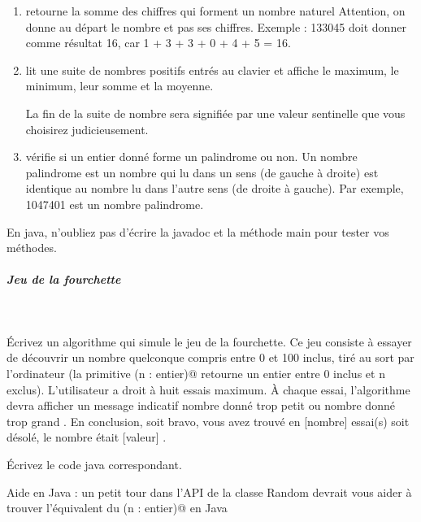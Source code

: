 \documentclass[11pt,a4paper]{article}
\begin{document}
\begin{enumerate}
			\item 
              retourne la somme des chiffres qui forment un nombre naturel \verb@n@
              Attention, on donne au d\'epart le nombre et pas ses chiffres. Exemple : 133045 doit donner
              comme r\'esultat 16, car 1 + 3 + 3 + 0 + 4 + 5 = 16.
            
			\item 
              lit une suite de nombres positifs entr\'es au clavier et affiche
              le maximum, le minimum, leur somme et la moyenne. \par
				
              La fin de la suite de nombre sera signifi\'ee par une valeur sentinelle que vous choisirez
              judicieusement.
            
			\item 
              v\'erifie si un entier donn\'e forme un palindrome ou non. Un nombre
              palindrome est un nombre qui lu dans un sens (de gauche \`a droite) est identique au nombre
              lu dans l'autre sens (de droite \`a gauche). Par exemple, 1047401 est un nombre palindrome.
            
					\end{enumerate}
				
            \par
        En java, n'oubliez pas d'\'ecrire la javadoc et la m\'ethode main pour tester vos m\'ethodes.
            \par
        
			
		\subparagraph{Jeu de la fourchette} 
		
					\textcolor{white}{.} \par
				
          \'Ecrivez un algorithme qui simule le jeu de la fourchette. Ce jeu consiste \`a essayer de d\'ecouvrir
          un nombre quelconque compris entre 0 et 100 inclus, tir\'e au sort par l'ordinateur (la primitive
          \verb@hasard(n : entier)@ retourne un entier entre 0 inclus et n exclus). 
          L'utilisateur a droit \`a huit essais maximum.
          \`A chaque essai, l'algorithme devra afficher un message indicatif \guillemotleft  nombre donn\'e trop petit \guillemotright 
          ou \guillemotleft  nombre donn\'e trop grand \guillemotright . En conclusion, soit \guillemotleft  bravo, vous avez trouv\'e en [nombre]
          essai(s) \guillemotright  soit \guillemotleft  d\'esol\'e, le nombre \'etait [valeur] \guillemotright .
        
            \par
        \'Ecrivez le code java correspondant.
            \par
        
        Aide en Java : un petit tour dans l'API de la classe Random devrait vous aider \`a trouver l'\'equivalent du
        \verb@hasard(n : entier)@ en Java
    
            \par
        
				
\end{document}
